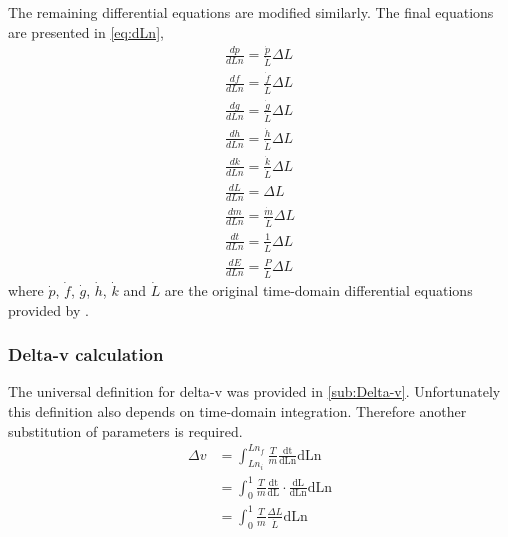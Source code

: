 The remaining differential equations are modified similarly. The final equations are presented in \eqref{eq:dLn},
\begin{subequations} \label{eq:dLn}
\begin{gather}
\frac{dp}{dLn}=\frac{\dot{p}}{\dot{L}}\Delta L \\
\frac{df}{dLn}=\frac{\dot{f}}{\dot{L}}\Delta L \\
\frac{dg}{dLn}=\frac{\dot{g}}{\dot{L}}\Delta L \\
\frac{dh}{dLn}=\frac{\dot{h}}{\dot{L}}\Delta L \\
\frac{dk}{dLn}=\frac{\dot{k}}{\dot{L}}\Delta L \\
\frac{dL}{dLn}=\Delta L \\
\frac{dm}{dLn}=\frac{\dot{m}}{\dot{L}}\Delta L \\
\frac{dt}{dLn}=\frac{1}{\dot{L}}\Delta L \\
\frac{dE}{dLn}=\frac{P}{\dot{L}}\Delta L 
\end{gather}
\end{subequations}
where $\dot{p}$, $\dot{f}$,  $\dot{g}$, $\dot{h}$, $\dot{k}$ and $\dot{L}$ are the original time-domain differential equations provided by \textcite{Walker1985}.

\subsubsection{Delta-v calculation}
The universal definition for delta-v was provided in \autoref{sub:Delta-v}. Unfortunately this definition also depends on time-domain integration. Therefore another substitution of parameters is required.
\begin{subequations}
\begin{align}
\Delta v &= \int^{Ln_f}_{Ln_i}\frac{T}{m}\frac{\text{dt}}{\text{dLn}}\text{dLn}\\
&= \int^{1}_{0}\frac{T}{m}\frac{\text{dt}}{\text{dL}}\cdot\frac{\text{dL}}{\text{dLn}}\text{dLn}\\
&= \int^{1}_{0}\frac{T}{m}\frac{\Delta L}{\dot L}\text{dLn}
\end{align}
\end{subequations}


